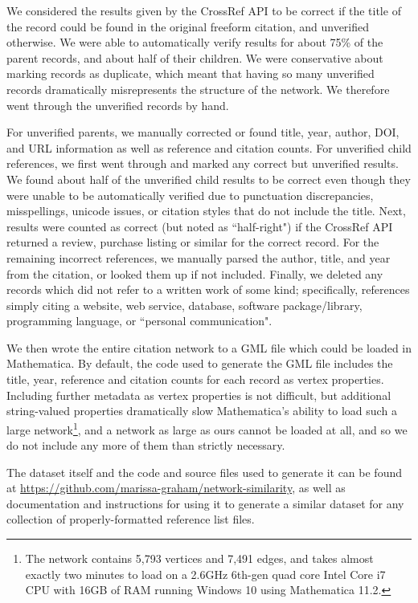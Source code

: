 \documentclass[12pt]{thesis}
\theoremstyle{plain}
\theoremstyle{definition}
\theoremstyle{remark}
\begin{document}
We considered the results given by the CrossRef API to be correct if the title of the record could be found in the original freeform citation, and unverified otherwise. We were able to automatically verify results for about 75\% of the parent records, and about half of their children. We were conservative about marking records as duplicate, which meant that having so many unverified records dramatically misrepresents the structure of the network. We therefore went through the unverified records by hand.

For unverified parents, we manually corrected or found title, year, author, DOI, and URL information as well as reference and citation counts. For unverified child references, we first went through and marked any correct but unverified results. We found about half of the unverified child results to be correct even though they were unable to be automatically verified due to punctuation discrepancies, misspellings, unicode issues, or citation styles that do not include the title. Next, results were counted as correct (but noted as ``half-right") if the CrossRef API returned a review, purchase listing or similar for the correct record. For the remaining incorrect references, we manually parsed the author, title, and year from the citation, or looked them up if not included. Finally, we deleted any records which did not refer to a written work of some kind; specifically, references simply citing a website, web service, database, software package/library, programming language, or ``personal communication".

We then wrote the entire citation network to a GML file which could be loaded in Mathematica. By default, the code used to generate the GML file includes the title, year, reference and citation counts for each record as vertex properties. Including further metadata as vertex properties is not difficult, but additional string-valued properties dramatically slow Mathematica's ability to load such a large network\footnote{The network contains 5,793 vertices and 7,491 edges, and takes almost exactly two minutes to load on a 2.6GHz 6th-gen quad core Intel Core i7 CPU with 16GB of RAM running Windows 10 using Mathematica 11.2.}, and a network as large as ours cannot be loaded at all, and so we do not include any more of them than strictly necessary.

The dataset itself and the code and source files used to generate it can be found at \url{https://github.com/marissa-graham/network-similarity}, as well as documentation and instructions for using it to generate a similar dataset for any collection of properly-formatted reference list files.
\end{document}
